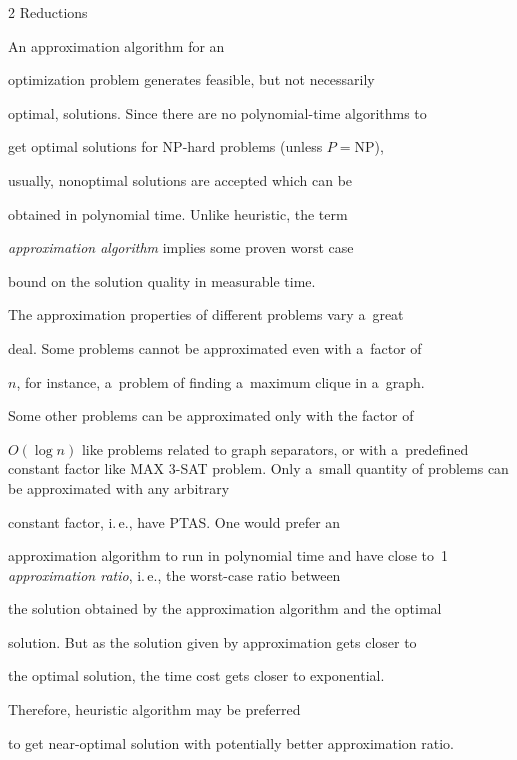 \begin{multicols}{2}
{Reductions} \label{s:AP}





\noindent


An approximation algorithm for an


optimization problem generates feasible, but not necessarily


optimal, solutions. Since there are no polynomial-time algorithms to


get optimal solutions for {NP}-hard problems (unless $P=\mathrm{NP}$),


usually, nonoptimal solutions are accepted which can be


obtained in polynomial time. Unlike heuristic, the term


\textit{approximation algorithm} implies some proven worst case


bound on the solution quality in measurable time.





The approximation properties of different problems vary a~great


deal. Some problems cannot be approximated even with a~factor of


$n$, for instance, a~problem of finding a~maximum clique in a~graph.


Some other problems can be approximated only with the factor of


$O(\log n)$ like problems related to graph separators, or with a~predefined constant factor like {MAX 3-SAT} problem. Only a~small quantity of problems can be approximated with any arbitrary


constant factor, i.\,e., have {PTAS}. One would prefer an


approximation algorithm to run in polynomial time and have close to~1 \textit{approximation ratio}, i.\,e., the worst-case ratio between


the solution obtained by the approximation algorithm and the optimal


solution. But as the solution given by approximation gets closer to


the optimal solution, the time cost gets closer to exponential.


Therefore, heuristic algorithm may be preferred


to get near-optimal solution with potentially better approximation ratio.






\end{multicols}
